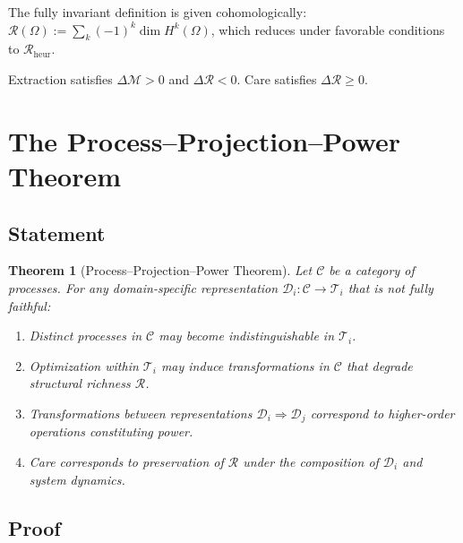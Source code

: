 \documentclass[11pt,a4paper]{article}
\newtheorem{theorem}{Theorem}[section]
\theoremstyle{definition}
\theoremstyle{remark}
\begin{document}
The fully invariant definition is given cohomologically: $\mathcal{R}(\Omega) := \sum_k (-1)^k \dim H^k(\Omega)$, which reduces under favorable conditions to $\mathcal{R}_{\mathrm{heur}}$.

Extraction satisfies $\Delta \mathcal{M} > 0$ and $\Delta \mathcal{R} < 0$. Care satisfies $\Delta \mathcal{R} \geq 0$.

\section{The Process--Projection--Power Theorem}

\subsection{Statement}

\begin{theorem}[Process--Projection--Power Theorem]
Let $\mathcal{C}$ be a category of processes. For any domain-specific representation $\mathcal{D}_i : \mathcal{C} \to \mathcal{T}_i$ that is not fully faithful:
\begin{enumerate}
\item Distinct processes in $\mathcal{C}$ may become indistinguishable in $\mathcal{T}_i$.
\item Optimization within $\mathcal{T}_i$ may induce transformations in $\mathcal{C}$ that degrade structural richness $\mathcal{R}$.
\item Transformations between representations $\mathcal{D}_i \Rightarrow \mathcal{D}_j$ correspond to higher-order operations constituting power.
\item Care corresponds to preservation of $\mathcal{R}$ under the composition of $\mathcal{D}_i$ and system dynamics.
\end{enumerate}
\end{theorem}

\subsection{Proof}
\end{document}
